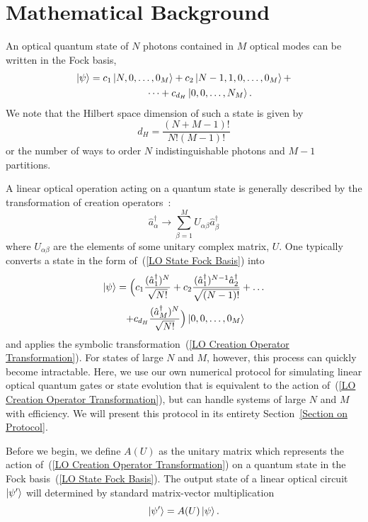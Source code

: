 \documentclass[aps,pra,twocolumn,showpacs,superscriptaddress,floatfix,10pt]{revtex4}
\begin{document}
\section{Mathematical Background}
\label{Intro}
An optical quantum state of $N$ photons contained in $M$ optical modes can be written in the Fock basis,
\begin{eqnarray}
	\label{LO State Fock Basis}
	\ket{\psi} = c_1 \ket{N,0,\dots,0_M} + c_2 \ket{N-1,1,0,\dots, 0_M} + \\* \dots  + c_{d_H} \ket{0,0,\dots,N_M}.	\nonumber \quad \quad \quad \quad
\end{eqnarray}
We note that the Hilbert space dimension of such a state is given by
\begin{equation}
\label{Hilbert Space Dimension}
	d_H = \frac{(N+M-1)!}{N!(M-1)!}
\end{equation}
or the number of ways to order $N$ indistinguishable photons and $M-1$ partitions.

A linear optical operation acting on a quantum state is generally described by the transformation of creation operators~\cite{Review Paper,Reck}:
\begin{equation}
\label{LO Creation Operator Transformation}
\hat{a}^\dagger_\alpha \rightarrow \sum_{\beta=1}^{M} U_{\alpha\beta} \hat{a}^\dagger_\beta
\end{equation}
where $U_{\alpha \beta}$ are the elements of some unitary complex matrix, $U$. One typically converts a state in the form of~(\ref{LO State Fock Basis}) into
\begin{eqnarray}
\ket{\psi} = \Big(c_1 \frac{(\hat{a}^\dagger_1)^N}{\sqrt{N!}} + c_2 \frac{ (\hat{a}^\dagger_1)^{N-1} \hat{a}^\dagger_2}{\sqrt{(N-1)!}} + \dots \\* + c_{d_H} \frac{(\hat{a}^\dagger_M)^N}{\sqrt{N!}}\Big) \ket{0,0,\dots,0_M} \quad \quad \nonumber
\end{eqnarray}
and applies the symbolic transformation~(\ref{LO Creation Operator Transformation}). For states of large $N$ and $M$, however, this process can quickly become intractable. Here, we use our own numerical protocol for simulating linear optical quantum gates or state evolution that is equivalent to the action of~(\ref{LO Creation Operator Transformation}), but can handle systems of large $N$ and $M$ with efficiency. We will present this protocol in its entirety Section~\ref{Section on Protocol}.

Before we begin, we define $A(U)$ as the unitary matrix which represents the action of~(\ref{LO Creation Operator Transformation}) on a quantum state in the Fock basis~(\ref{LO State Fock Basis}). The output state of a linear optical circuit $\ket{\psi^\prime}$ will determined by standard matrix-vector multiplication
\begin{equation}
\label{Matrix Vector Product}
\ket{\psi^\prime} = A(U) \ket{\psi}.
\end{equation}
\end{document}
